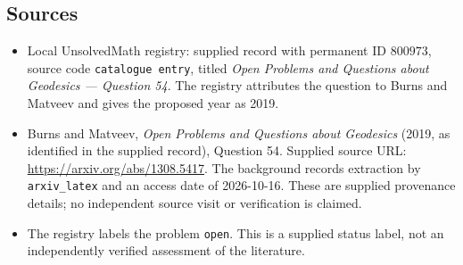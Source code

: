 \documentclass[11pt]{article}
\begin{document}
\subsection{Sources}
\begin{itemize}
\item Local UnsolvedMath registry: supplied record with permanent ID \(800973\), source code \texttt{catalogue entry}, titled \emph{Open Problems and Questions about Geodesics --- Question 54}. The registry attributes the question to Burns and Matveev and gives the proposed year as 2019.
\item Burns and Matveev, \emph{Open Problems and Questions about Geodesics} (2019, as identified in the supplied record), Question 54. Supplied source URL: \url{https://arxiv.org/abs/1308.5417}. The background records extraction by \texttt{arxiv\_latex} and an access date of 2026-10-16. These are supplied provenance details; no independent source visit or verification is claimed.
\item The registry labels the problem \texttt{open}. This is a supplied status label, not an independently verified assessment of the literature.
\end{itemize}
\end{document}
